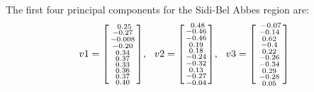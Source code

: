 \documentclass[10pt]{article}
\numberwithin{equation}{section}
\numberwithin{figure}{section}
\numberwithin{table}{section}
\begin{document}
The first four principal components for the Sidi-Bel Abbes region are:
\begin{equation*}
    v1 = 
        \begin{bsmallmatrix}
            \
            0.25\\
            -0.27\\
            -0.008\\
            -0.20\\
            0.34\\
            0.37\\
            0.33\\
            0.36\\
            0.37\\
            0.40
            
        \end{bsmallmatrix}, \hspace{7pt}
    v2 = 
        \begin{bsmallmatrix}
        \
                0.48\\
                -0.46\\
                -0.46\\
                0.19\\
                0.18\\
                -0.24\\
                -0.32\\
                0.13\\
                -0.27\\
                -0.04
           
        \end{bsmallmatrix}, \hspace{7pt}
    v3 = 
        \begin{bsmallmatrix}
           \
                -0.07\\
                -0.14\\
                0.62\\
                -0.4\\
                0.22\\
                -0.26\\
                -0.34\\
                0.29\\
                -0.28\\
                0.05
            

\end{bsmallmatrix}
\end{equation*}
\end{document}
